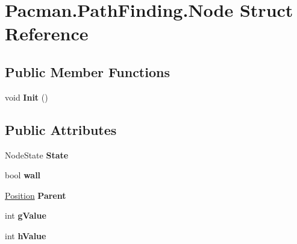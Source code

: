 \hypertarget{struct_pacman_1_1_path_finding_1_1_node}{\section{Pacman.\-Path\-Finding.\-Node Struct Reference}
\label{struct_pacman_1_1_path_finding_1_1_node}
}
\subsection*{Public Member Functions}
\begin{DoxyCompactItemize}
\item 
\hypertarget{struct_pacman_1_1_path_finding_1_1_node_a997f021baab5100b2b7848ea005b5bb8}{void {\bfseries Init} ()}\label{struct_pacman_1_1_path_finding_1_1_node_a997f021baab5100b2b7848ea005b5bb8}

\end{DoxyCompactItemize}
\subsection*{Public Attributes}
\begin{DoxyCompactItemize}
\item 
\hypertarget{struct_pacman_1_1_path_finding_1_1_node_a984787c7a12094c294a009addd283d3c}{Node\-State {\bfseries State}}\label{struct_pacman_1_1_path_finding_1_1_node_a984787c7a12094c294a009addd283d3c}

\item 
\hypertarget{struct_pacman_1_1_path_finding_1_1_node_a7cf4681e38de8676a6b22af9a0b2c2f6}{bool {\bfseries wall}}\label{struct_pacman_1_1_path_finding_1_1_node_a7cf4681e38de8676a6b22af9a0b2c2f6}

\item 
\hypertarget{struct_pacman_1_1_path_finding_1_1_node_a3c12ada96c69a8368a78a196bdabddf1}{\hyperlink{struct_pacman_1_1_path_finding_1_1_position}{Position} {\bfseries Parent}}\label{struct_pacman_1_1_path_finding_1_1_node_a3c12ada96c69a8368a78a196bdabddf1}

\item 
\hypertarget{struct_pacman_1_1_path_finding_1_1_node_a5e8fb44081d6fda396e0939372489c60}{int {\bfseries g\-Value}}\label{struct_pacman_1_1_path_finding_1_1_node_a5e8fb44081d6fda396e0939372489c60}

\item 
\hypertarget{struct_pacman_1_1_path_finding_1_1_node_a12375ab3593ca39fb8229cc17f017aa3}{int {\bfseries h\-Value}}\label{struct_pacman_1_1_path_finding_1_1_node_a12375ab3593ca39fb8229cc17f017aa3}

\end{DoxyCompactItemize}
